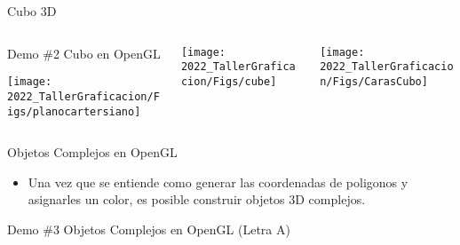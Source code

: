 \begin{frame}{Cubo 3D}

\begin{columns}
\begin{column}{0.4\textwidth}



\begin{block}{Demo \#2}
Cubo en OpenGL
\end{block}
\begin{center}
 \texttt{[image: 2022\_TallerGraficacion/Figs/planocartersiano]}
 \end{center}
\end{column}
\begin{column}{0.4\textwidth}
\begin{center}

  \texttt{[image: 2022\_TallerGraficacion/Figs/cube]}
 \end{center}

\end{column}
\begin{column}{0.3\textwidth}
\begin{center}

 \texttt{[image: 2022\_TallerGraficacion/Figs/CarasCubo]}
 \end{center}
\end{column}
\end{columns}

\end{frame}




\begin{frame}{Objetos Complejos en OpenGL}
\begin{itemize}
\item Una vez que se entiende como generar las coordenadas de poligonos y asignarles un color, es posible construir objetos 3D complejos.
\end{itemize}

\begin{block}{Demo \#3}
Objetos Complejos en OpenGL (Letra A)
\end{block}
\end{frame}


